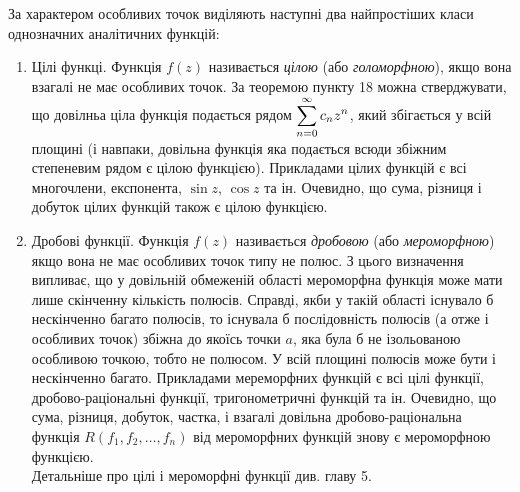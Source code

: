 За характером особливих точок виділяють наступні два найпростіших класи однозначних аналітичних функцій:
\begin{enumerate}
	\item Цілі функці. Функція $f(z)$ називається \textit{цілою} (або \textit{голоморфною}), якщо вона взагалі не має особливих точок. За теоремою пункту 18 можна стверджувати, що довілньа ціла функція подається рядом $\displaystyle\sum\limits_{n = 0}^\infty c_n z^n$, який збігається у всій площині (і навпаки, довільна функція яка подається всюди збіжним степеневим рядом є цілою функцією). Прикладами цілих функцій є всі многочлени, експонента, $\sin z$, $\cos z$ та ін. Очевидно, що сума, різниця і добуток цілих функцій також є цілою функцією.

	\item Дробові функції. Функція $f(z)$ називається \textit{дробовою} (або \textit{мероморфною}) якщо вона не має особливих точок типу не полюс. З цього визначення випливає, що у довільній обмеженій області мероморфна функція може мати лише скінченну кількість полюсів. Справді, якби у такій області існувало б нескінченно багато полюсів, то існувала б послідовність полюсів (а отже і особливих точок) збіжна до якоїсь точки $a$, яка була б не ізольованою особливою точкою, тобто не полюсом. У всій площині полюсів може бути і нескінченно багато. Прикладами мереморфних функцій є всі цілі функції, дробово-раціональні функції, тригонометричні функцій та ін. Очевидно, що сума, різниця, добуток, частка, і взагалі довільна дробово-раціональна функція $R(f_1, f_2, \ldots, f_n)$ від мероморфних функцій знову є мероморфною функцією. \\

	Детальніше про цілі і мероморфні функції див. главу 5.
\end{enumerate}


% 